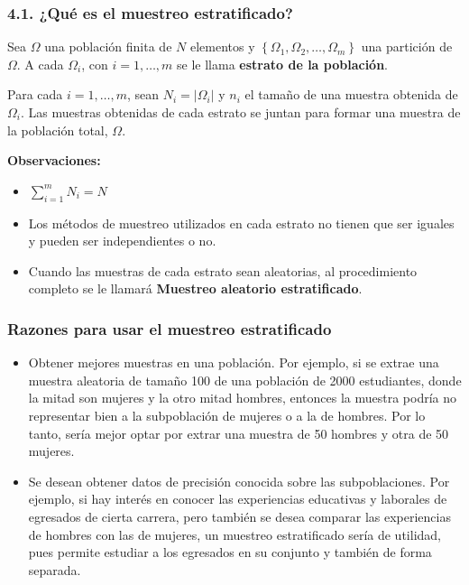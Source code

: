 \documentclass[hyperref={bookmarks=false},aspectratio=169, 10pt]{beamer}
\begin{document}
\begin{frame}
    \frametitle{4.1. ¿Qué es el muestreo estratificado?}
  
    Sea $ \Omega $ una población finita de $ N $ elementos y $ \left\lbrace \Omega_1, \Omega_2, \ldots, \Omega_m \right\rbrace $ una partición de $ \Omega $. A cada $ \Omega_i $, con $ i = 1, \ldots, m $ se le llama \textbf{estrato de la población}. 

    Para cada $ i = 1, \ldots, m $, sean $ N_i = \left| \Omega_i \right| $ y $ n_i $ el tamaño de una muestra obtenida de $ \Omega_i $. Las muestras obtenidas de cada estrato se juntan para formar una muestra de la población total, $ \Omega $. \vspace{3mm}
    
    \textbf{Observaciones:}

    \begin{itemize}
        \item<1-> $ \displaystyle \sum_{i=1}^{m} N_i = N $
        \item<2-> Los métodos de muestreo utilizados en cada estrato no tienen que ser iguales y pueden ser independientes o no.
        \item<3-> Cuando las muestras de cada estrato sean aleatorias, al procedimiento completo se le llamará \textbf{Muestreo aleatorio estratificado}.
    \end{itemize}
\end{frame}


\begin{frame}
    \frametitle{Razones para usar el muestreo estratificado}

    \begin{itemize}
        \item<1-> Obtener mejores muestras en una población. Por ejemplo, si se extrae una muestra aleatoria de tamaño 100 de una población de 2000 estudiantes, donde la mitad son mujeres y la otro mitad hombres, entonces la muestra podría no representar bien a la subpoblación de mujeres o a la de hombres. Por lo tanto, sería mejor optar por extrar una muestra de 50 hombres y otra de 50 mujeres.
        \item<2-> Se desean obtener datos de precisión conocida sobre las subpoblaciones. Por ejemplo, si hay interés en conocer las experiencias educativas y laborales de egresados de cierta carrera, pero también se desea comparar las experiencias de hombres con las de mujeres, un muestreo estratificado sería de utilidad, pues permite estudiar a los egresados en su conjunto y también de forma separada.
    \end{itemize}
\end{frame}
\end{document}
